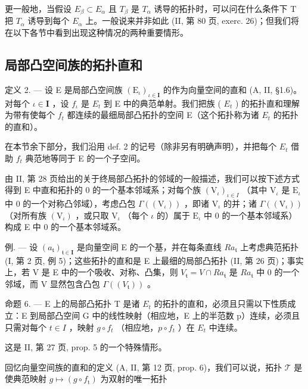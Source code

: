 更一般地，当假设 \(E_{\beta} \subset E_{\alpha}\) 且 \(T_{\beta}\) 是 \(T_{\alpha}\) 诱导的拓扑时，可以问在什么条件下 T 把 \(T_{\alpha}\) 诱导到每个 \(E_{\alpha}\) 上。一般说来并非如此 (II, 第 80 页, exerc. 26)；但我们将在以下各节中看到出现这种情况的两种重要情形。

\subsection{局部凸空间族的拓扑直和}

定义 2. --- 设 E 是局部凸空间族 \((\mathrm{E}_{\iota})_{\iota \in \mathbf{I}}\) 的作为向量空间的直和 (A, II, §1.6)。对每个 \(\iota \in \mathbf{I}\) ，设 \(f_{\iota}\) 是 \(E_{t}\) 到 E 中的典范单射。我们把族 ( \(E_{t}\) ) 的拓扑直和理解为带有使每个 \(f_{t}\) 都连续的最细局部凸拓扑的空间 E（这个拓扑称为诸 \(E_{t}\) 的拓扑的直和）。

在本节余下部分，我们沿用 def. 2 的记号（除非另有明确声明），并把每个 \(E_{t}\) 借助 \(f_{t}\) 典范地等同于 E 的一个子空间。

由 II, 第 28 页给出的关于终局部凸拓扑的邻域的一般描述，我们可以按下述方式得到 E 中直和拓扑的 0 的一个基本邻域系；对每个族 \((\mathrm{V}_{\iota})_{\iota \in I}\) （其中 \(\mathrm{V}_{\iota}\) 是 \(\mathrm{E}_{\iota}\) 中 0 的一个对称凸邻域），考虑凸包 \(\Gamma((\mathrm{V}_{\iota}))\) ，即诸 \(\mathrm{V}_{\iota}\) 的并；诸 \(\Gamma((\mathrm{V}_{\iota}))\) （对所有族 \((\mathrm{V}_{\iota})\) ，或只取 \(\mathrm{V}_{\iota}\) （每个 \(\iota\) 的）属于 \(\mathrm{E}_{\iota}\) 中 0 的一个基本邻域系）构成 E 中 0 的一个基本邻域系。

例. --- 设 \((a_{\mathfrak{t}})_{\mathfrak{t}\in\mathbf{I}}\) 是向量空间 E 的一个基，并在每条直线 \(Ra_{\mathfrak{t}}\) 上考虑典范拓扑 (I, 第 2 页, 例 5)；这些拓扑的直和是 E 上最细的局部凸拓扑 (II, 第 26 页)；事实上，若 V 是 E 中的一个吸收、对称、凸集，则 \(V_{\mathfrak{t}} = V \cap Ra_{\mathfrak{t}}\) 是 \(Ra_{\mathfrak{t}}\) 中 0 的一个邻域，而 V 显然包含凸包 \(\Gamma((V_{\mathfrak{t}}))\) 。

命题 6. --- E 上的局部凸拓扑 T 是诸 \(E_{t}\) 的拓扑的直和，必须且只需以下性质成立：E 到局部凸空间 G 中的线性映射（相应地，E 上的半范数 p）连续，必须且只需对每个 \(t \in I\) ，映射 \(g \circ f_{t}\) （相应地，\(p \circ f_{t}\) ）在 \(E_{t}\) 中连续。

这是 II, 第 27 页, prop. 5 的一个特殊情形。

回忆向量空间族的直和的定义 (A, II, 第 12 页, prop. 6)，我们可以说，拓扑 \(\mathcal{T}\) 是使典范映射 \(g \mapsto (g \circ f_{\mathrm{t}})\) 为双射的唯一拓扑

